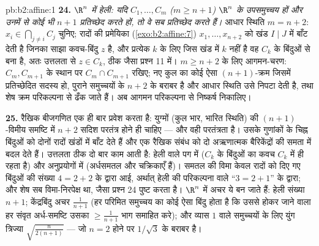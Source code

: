 \begin{solution}{pb:b2:affine:1}
\textbf{24.} \emph{$\R^n$ में हेली: यदि $C_1, \dots, C_m$ ($m \geq n + 1$) $\R^n$ के  उपसमुच्चय हों
और उनमें से कोई भी $n + 1$ प्रतिच्छेद करते हों, तो वे सब प्रतिच्छेद करते हैं।}
आधार स्थिति $m = n +
2$: $x_i \in \bigcap_{j\neq i}C_j$ चुनिए; रादों की प्रमेयिका (\cref{exo:b2:affine:7}) $x_1, \dots, x_{n+2}$ को खंड $I \mid J$ में
बाँट देती है जिनका साझा कवच-बिंदु $z$ है, और प्रत्येक $k$ के लिए जिस खंड
में $k$ नहीं है वह $C_k$ के बिंदुओं से बना है, अतः उत्तलता से $z \in C_k$, ठीक
जैसा प्रश्न 11 में। $m \geq n + 2$ के लिए आगमन-चरण: $C_m,
C_{m+1}$ के स्थान पर $C_m \cap C_{m+1}$ रखिए; नए
कुल का कोई ऐसा $(n+1)$-क्रम जिसमें प्रतिच्छेदित सदस्य हो, पुराने समुच्चयों के
$n + 2$ के बराबर है और आधार स्थिति उसे निपटा देती है, तथा शेष क्रम परिकल्पना
से ढँक जाते हैं। अब आगमन परिकल्पना से निष्कर्ष निकालिए।

\textbf{25.} रैखिक बीजगणित एक ही बार प्रवेश करता है: युग्मों (कुल भार,
भारित स्थिति) की $(n+1)$-विमीय समष्टि में $n + 2$ सदिश परतंत्र होने ही चाहिए ---
और वही  परतंत्रता है। उसके गुणांकों के चिह्न बिंदुओं को दोनों रादों
खंडों में बाँट देते हैं और एक रैखिक संबंध को दो अऋणात्मक बैरिकेंद्रों की
समता में बदल देते हैं। उत्तलता ठीक दो बार काम आती है: हेली वाले पग में
($C_k$ के बिंदुओं का कवच $C_k$ में ही रहता है) और अनुप्रयोगों में (अर्धसमतल
और चक्रिकाएँ  हैं)। समतल की विमा केवल रादों को दिए गए बिंदुओं की
संख्या $4 = 2 + 2$ के द्वारा आई, अर्थात् हेली की परिकल्पना वाले ``$3 = 2 + 1$'' के द्वारा;
और शेष सब विमा-निरपेक्ष था, जैसा प्रश्न 24 पुष्ट करता है। $\R^n$ में अचर ये
बन जाते हैं: हेली संख्या $n + 1$; केंद्रबिंदु अचर $\frac1{n+1}$ (हर परिमित समुच्चय का
कोई ऐसा बिंदु होता है कि उससे होकर जाने वाला हर संवृत अर्ध-समष्टि उसका $\geq
\frac1{n+1}$
भाग समाहित करे); और व्यास $1$ वाले समुच्चयों के लिए युंग त्रिज्या $\sqrt{\frac{n}{2(n+1)}}$ ---
जो $n = 2$ होने पर $1/\sqrt3$ के बराबर है।
\end{solution}

